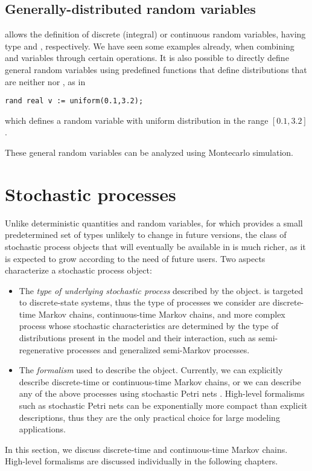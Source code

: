 \subsection{Generally-distributed random variables}

{\smart} allows the definition of discrete (integral) or continuous random
variables, having type  and , respectively.
We have seen some examples already, when combining 
and  variables through certain operations.
It is also possible to directly define general random variables
using predefined functions that define distributions that
are neither  nor , as in
\begin{lstlisting}
rand real v := uniform(0.1,3.2);
\end{lstlisting}
which defines a random variable  with uniform distribution
in the range $[0.1, 3.2]$.

These general random variables can be analyzed using Montecarlo simulation.



\section{Stochastic processes} \label{SEC:StochasticProcesses}

Unlike deterministic quantities and random variables,
for which {\smart} provides a small predetermined set of types
unlikely to change in future versions,
the class of stochastic process objects that will eventually be
available in {\smart} is much richer, as it is expected to grow according
to the need of future users.
Two aspects characterize a stochastic process object:
\begin{itemize}
\item
The \emph{type of underlying stochastic process} described by the object.
{\smart} is targeted to discrete-state systems, thus the type of
processes we consider are \cite{Cinlar1975,Kemeny1960}
discrete-time Markov chains,
continuous-time Markov chains,
and more complex process whose stochastic characteristics are determined
by the type of distributions present in the model and their interaction,
such as semi-regenerative processes and generalized semi-Markov processes.
\item
The \emph{formalism} used to describe the object.
Currently, we can explicitly describe discrete-time or continuous-time
Markov chains, or we can describe any of the above processes using
stochastic Petri nets \cite{1994IEEETSE-SPNcharacterization}.
High-level formalisms such as stochastic Petri nets can be exponentially
more compact than explicit descriptions, thus they are the only
practical choice for large modeling applications.
\end{itemize}
In this section, we discuss discrete-time and continuous-time Markov chains.
High-level formalisms are discussed individually in the following chapters.

